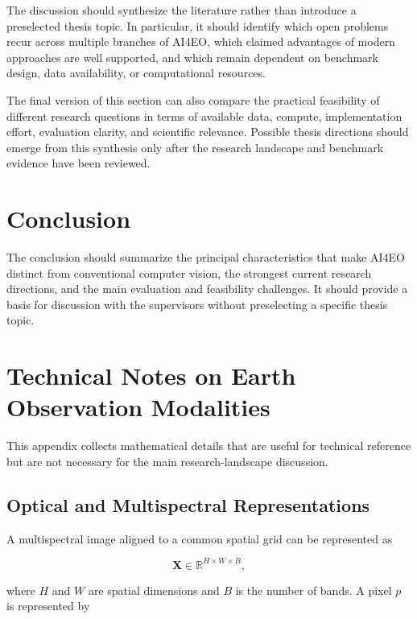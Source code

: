 \documentclass[
    11pt,
    a4paper,
    parskip=half,
    bibliography=totoc,
    numbers=noenddot
]{scrartcl}
\begin{document}
The discussion should synthesize the literature rather than introduce a
preselected thesis topic. In particular, it should identify which open
problems recur across multiple branches of AI4EO, which claimed
advantages of modern approaches are well supported, and which remain
dependent on benchmark design, data availability, or computational
resources.

The final version of this section can also compare the practical
feasibility of different research questions in terms of available data,
compute, implementation effort, evaluation clarity, and scientific
relevance. Possible thesis directions should emerge from this synthesis
only after the research landscape and benchmark evidence have been
reviewed.

\section{Conclusion}

The conclusion should summarize the principal characteristics that make
AI4EO distinct from conventional computer vision, the strongest current
research directions, and the main evaluation and feasibility challenges.
It should provide a basis for discussion with the supervisors without
preselecting a specific thesis topic.


\appendix

\section{Technical Notes on Earth Observation Modalities}
\label{app:eo-technical}

This appendix collects mathematical details that are useful for technical
reference but are not necessary for the main research-landscape
discussion.

\subsection{Optical and Multispectral Representations}

A multispectral image aligned to a common spatial grid can be represented
as

\[
\mathbf{X}\in\mathbb{R}^{H\times W\times B},
\]

where \(H\) and \(W\) are spatial dimensions and \(B\) is the number of
bands. A pixel \(p\) is represented by
\end{document}
